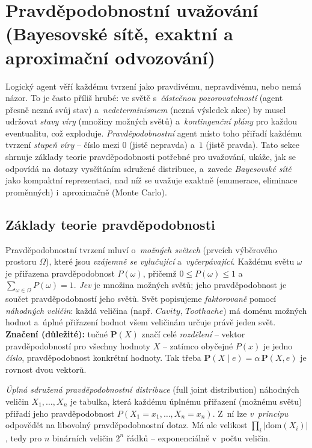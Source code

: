 \section{Pravděpodobnostní uvažování (Bayesovské sítě, exaktní a aproximační odvozování)}

Logický agent věří každému tvrzení jako pravdivému, nepravdivému, nebo nemá názor. To je často příliš hrubé: ve světě s~\emph{částečnou pozorovatelností} (agent přesně nezná svůj stav) a~\emph{nedeterminismem} (nezná výsledek akce) by musel udržovat \emph{stavy víry} (množiny možných světů) a~\emph{kontingenční plány} pro každou eventualitu, což exploduje. \emph{Pravděpodobnostní} agent místo toho přiřadí každému tvrzení \emph{stupeň víry} -- číslo mezi $0$ (jistě nepravda) a~$1$ (jistě pravda). Tato sekce shrnuje základy teorie pravděpodobnosti potřebné pro uvažování, ukáže, jak se odpovídá na dotazy vysčítáním sdružené distribuce, a~zavede \emph{Bayesovské sítě} jako kompaktní reprezentaci, nad níž se uvažuje exaktně (enumerace, eliminace proměnných) i~aproximačně (Monte Carlo).

\subsection{Základy teorie pravděpodobnosti}

Pravděpodobnostní tvrzení mluví o~\emph{možných světech} (prvcích výběrového prostoru $\Omega$), které jsou \emph{vzájemně se vylučující} a~\emph{vyčerpávající}. Každému světu $\omega$ je přiřazena pravděpodobnost $P(\omega)$, přičemž $0\le P(\omega)\le 1$ a~$\sum_{\omega\in\Omega} P(\omega)=1$. \emph{Jev} je množina možných světů; jeho pravděpodobnost je součet pravděpodobností jeho světů. Svět popisujeme \emph{faktorovaně} pomocí \emph{náhodných veličin}: každá veličina (např. $Cavity$, $Toothache$) má doménu možných hodnot a~úplné přiřazení hodnot všem veličinám určuje právě jeden svět. \textbf{Značení (důležité):} tučné $\mathbf{P}(X)$ značí celé \emph{rozdělení} -- vektor pravděpodobností pro všechny hodnoty $X$ -- zatímco obyčejné $P(x)$ je jedno \emph{číslo}, pravděpodobnost konkrétní hodnoty. Tak třeba $\mathbf{P}(X\mid e)=\alpha\,\mathbf{P}(X,e)$ je rovnost dvou vektorů.

\begin{definice}
\emph{Úplná sdružená pravděpodobnostní distribuce} (full joint distribution) náhodných veličin $X_1,\dots,X_n$ je tabulka, která každému úplnému přiřazení (možnému světu) přiřadí jeho pravděpodobnost $P(X_1{=}x_1,\dots,X_n{=}x_n)$. Z~ní lze \emph{v~principu} odpovědět na libovolný pravděpodobnostní dotaz. Má ale velikost $\prod_i |\mathrm{dom}(X_i)|$, tedy pro $n$ binárních veličin $2^n$ řádků -- exponenciálně v~počtu veličin.
\end{definice}

